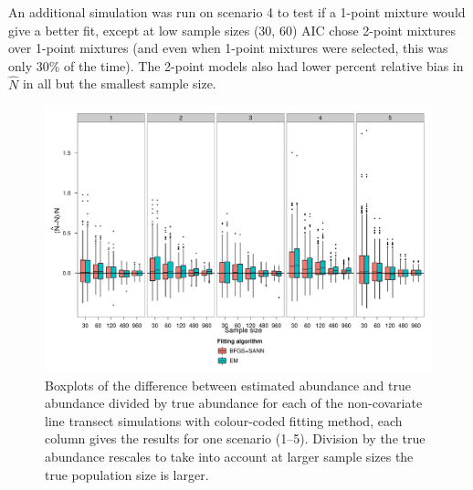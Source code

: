 An additional simulation was run on scenario 4 to test if a 1-point mixture would give a better fit, except at low sample sizes (30, 60) AIC chose 2-point mixtures over 1-point mixtures (and even when 1-point mixtures were selected, this was only 30\% of the time). The 2-point models also had lower percent relative bias in $\hat{N}$ in all but the smallest sample size.

\begin{figure}
\centering
\includegraphics[width=6in]{mix/figs/nocov-N.pdf}
\caption{Boxplots of the difference between estimated abundance and true abundance divided by true abundance for each of the non-covariate line transect simulations with colour-coded fitting method, each column gives the results for one scenario (1--5). Division by the true abundance rescales to take into account at larger sample sizes the true population size is larger.}
\label{mmds-nocov-N-boxplots}
\end{figure}

